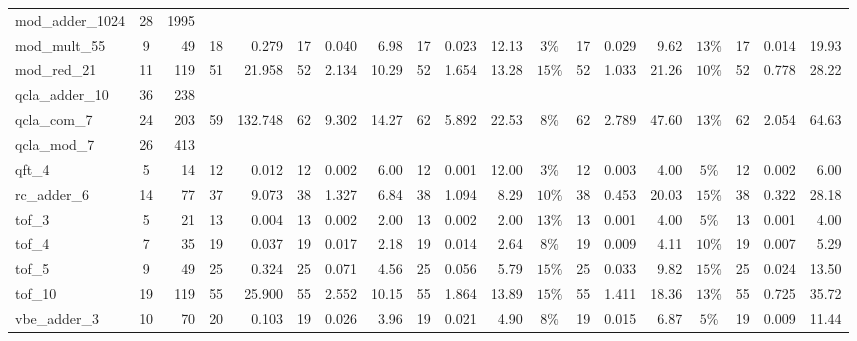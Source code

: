 \begin{table}[H]
\begin{tabular}{l c r | r r | r r r | r r r | c r r r | c r r r}
mod\_adder\_1024 & 28 & 1995 &  &  &  &  &  &  &  &  &  &  &  &  &  &  &  &  \\
mod\_mult\_55 & 9 & 49 & 18 & 0.279 & \cellcolor{bestT}17 & 0.040 & 6.98 & \cellcolor{bestT}17 & 0.023 & 12.13 & $3\%$ & 17 & 0.029 & 9.62 & $13\%$ & \cellcolor{bestT}17 & \cellcolor{bestTime}0.014 & 19.93 \\
mod\_red\_21 & 11 & 119 & \cellcolor{bestT}51 & 21.958 & 52 & 2.134 & 10.29 & 52 & 1.654 & 13.28 & $15\%$ & 52 & 1.033 & 21.26 & $10\%$ & 52 & \cellcolor{bestTime}0.778 & 28.22 \\
qcla\_adder\_10 & 36 & 238 &  &  &  &  &  &  &  &  &  &  &  &  &  &  &  &  \\
qcla\_com\_7 & 24 & 203 & \cellcolor{bestT}59 & 132.748 & 62 & 9.302 & 14.27 & 62 & 5.892 & 22.53 & $8\%$ & 62 & 2.789 & 47.60 & $13\%$ & 62 & \cellcolor{bestTime}2.054 & 64.63 \\
qcla\_mod\_7 & 26 & 413 &  &  &  &  &  &  &  &  &  &  &  &  &  &  &  &  \\
qft\_4 & 5 & 14 & \cellcolor{bestT}12 & 0.012 & \cellcolor{bestT}12 & 0.002 & 6.00 & \cellcolor{bestT}12 & \cellcolor{bestTime}0.001 & 12.00 & $3\%$ & 12 & 0.003 & 4.00 & $5\%$ & \cellcolor{bestT}12 & 0.002 & 6.00 \\
rc\_adder\_6 & 14 & 77 & \cellcolor{bestT}37 & 9.073 & 38 & 1.327 & 6.84 & 38 & 1.094 & 8.29 & $10\%$ & 38 & 0.453 & 20.03 & $15\%$ & 38 & \cellcolor{bestTime}0.322 & 28.18 \\
tof\_3 & 5 & 21 & \cellcolor{bestT}13 & 0.004 & \cellcolor{bestT}13 & 0.002 & 2.00 & \cellcolor{bestT}13 & 0.002 & 2.00 & $13\%$ & 13 & 0.001 & 4.00 & $5\%$ & \cellcolor{bestT}13 & \cellcolor{bestTime}0.001 & 4.00 \\
tof\_4 & 7 & 35 & \cellcolor{bestT}19 & 0.037 & \cellcolor{bestT}19 & 0.017 & 2.18 & \cellcolor{bestT}19 & 0.014 & 2.64 & $8\%$ & 19 & 0.009 & 4.11 & $10\%$ & \cellcolor{bestT}19 & \cellcolor{bestTime}0.007 & 5.29 \\
tof\_5 & 9 & 49 & \cellcolor{bestT}25 & 0.324 & \cellcolor{bestT}25 & 0.071 & 4.56 & \cellcolor{bestT}25 & 0.056 & 5.79 & $15\%$ & 25 & 0.033 & 9.82 & $15\%$ & \cellcolor{bestT}25 & \cellcolor{bestTime}0.024 & 13.50 \\
tof\_10 & 19 & 119 & \cellcolor{bestT}55 & 25.900 & \cellcolor{bestT}55 & 2.552 & 10.15 & \cellcolor{bestT}55 & 1.864 & 13.89 & $15\%$ & 55 & 1.411 & 18.36 & $13\%$ & \cellcolor{bestT}55 & \cellcolor{bestTime}0.725 & 35.72 \\
vbe\_adder\_3 & 10 & 70 & 20 & 0.103 & \cellcolor{bestT}19 & 0.026 & 3.96 & \cellcolor{bestT}19 & 0.021 & 4.90 & $8\%$ & 19 & 0.015 & 6.87 & $5\%$ & \cellcolor{bestT}19 & \cellcolor{bestTime}0.009 & 11.44 \\
\bottomrule
\end{tabular}
\end{table}
